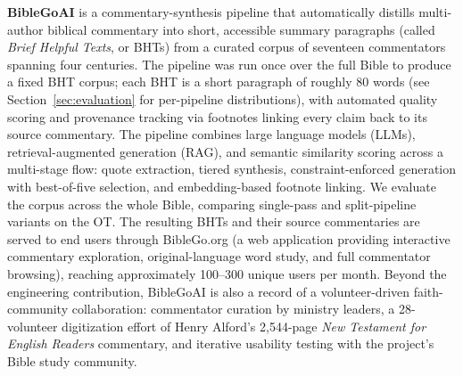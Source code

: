 \textbf{BibleGoAI} is a commentary-synthesis pipeline that automatically distills multi-author biblical commentary into short, accessible summary paragraphs (called \textit{Brief Helpful Texts}, or BHTs) from a curated corpus of seventeen commentators spanning four centuries. The pipeline was run once over the full Bible to produce a fixed BHT corpus; each BHT is a short paragraph of roughly 80 words (see Section~\ref{sec:evaluation} for per-pipeline distributions), with automated quality scoring and provenance tracking via footnotes linking every claim back to its source commentary. The pipeline combines large language models (LLMs), retrieval-augmented generation (RAG), and semantic similarity scoring across a multi-stage flow: quote extraction, tiered synthesis, constraint-enforced generation with best-of-five selection, and embedding-based footnote linking. We evaluate the corpus across the whole Bible, comparing single-pass and split-pipeline variants on the OT. The resulting BHTs and their source commentaries are served to end users through BibleGo.org (a web application providing interactive commentary exploration, original-language word study, and full commentator browsing), reaching approximately 100--300 unique users per month. Beyond the engineering contribution, BibleGoAI is also a record of a volunteer-driven faith-community collaboration: commentator curation by ministry leaders, a 28-volunteer digitization effort of Henry Alford's 2{,}544-page \textit{New Testament for English Readers} commentary, and iterative usability testing with the project's Bible study community.
